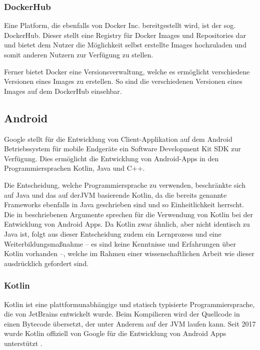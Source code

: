 			\subsubsection{DockerHub} %
				
				Eine Platform, die ebenfalls von Docker Inc. bereitgestellt wird, ist der sog. DockerHub. Dieser stellt eine Registry für Docker Images und Repositories dar und bietet dem Nutzer die Möglichkeit selbst erstellte Images hochzuladen und somit anderen Nutzern zur Verfügung zu stellen. 
				
				Ferner bietet Docker eine Versionsverwaltung, welche es ermöglicht verschiedene Versionen eines Images zu erstellen. So sind die verschiedenen Versionen eines Images auf dem DockerHub einsehbar.
		
		\subsection{Android} %
	
			Google stellt für die Entwicklung von Client-Applikation auf dem Android Betriebssystem für mobile Endgeräte ein Software Development Kit \acs{SDK} zur Verfügung. Dies ermöglicht die Entwicklung von Android-Apps in den Programmiersprachen Kotlin, Java und C++. 
			
			Die Entscheidung, welche Programmiersprache zu verwenden, beschränkte sich auf Java und das auf der\acs{JVM} basierende Kotlin, da die bereits genannte Frameworks ebenfalls in Java geschrieben sind und so Einheitlichkeit herrscht. Die in \cite{Dossey.2019} beschriebenen Argumente sprechen für die Verwendung von Kotlin bei der Entwicklung von Android Apps. Da Kotlin zwar ähnlich, aber nicht identisch zu Java ist, folgt aus dieser Entscheidung zudem ein Lernprozess und eine Weiterbildungsmaßnahme -- es sind keine Kenntnisse und Erfahrungen über Kotlin vorhanden --, welche im Rahmen einer wissenschaftlichen Arbeit wie dieser ausdrücklich gefordert sind.
		
			\subsubsection{Kotlin} %
			
				Kotlin ist eine plattformunabhängige und statisch typisierte Programmiersprache, die von JetBrains entwickelt wurde. Beim Kompilieren wird der Quellcode in einen Bytecode übersetzt, der unter Anderem auf der JVM laufen kann. Seit 2017 wurde Kotlin offiziell von Google für die Entwicklung von Android Apps unterstützt \cite{JetBrains.2017}. 
				
